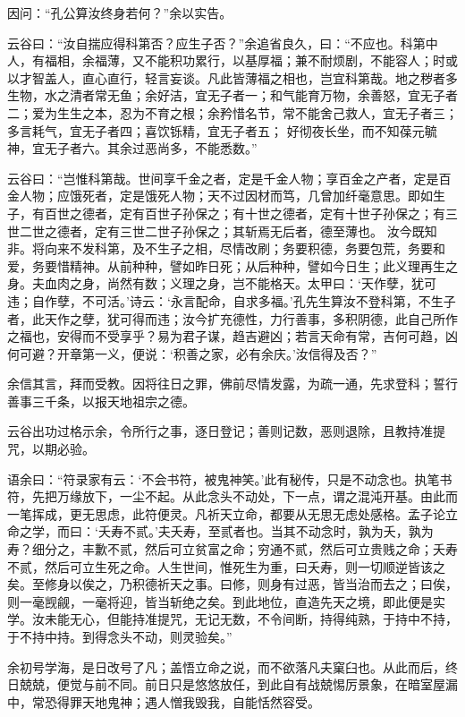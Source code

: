 \documentclass[letterpaper,10pt,english]{sphinxmanual}
\begin{document}
因问：“孔公算汝终身若何？”余以实告。

云谷曰：“汝自揣应得科第否？应生子否？”余追省良久，曰：“不应也。科第中人，有福相，余福薄，又不能积功累行，以基厚福；兼不耐烦剧，不能容人；时或以才智盖人，直心直行，轻言妄谈。凡此皆薄福之相也，岂宜科第哉。地之秽者多生物，水之清者常无鱼；余好洁，宜无子者一；和气能育万物，余善怒，宜无子者二；爱为生生之本，忍为不育之根；余矜惜名节，常不能舍己救人，宜无子者三； 多言耗气，宜无子者四；喜饮铄精，宜无子者五； 好彻夜长坐，而不知葆元毓神，宜无子者六。其余过恶尚多，不能悉数。”

云谷曰：“岂惟科第哉。世间享千金之者，定是千金人物；享百金之产者，定是百金人物；应饿死者，定是饿死人物；天不过因材而笃，几曾加纤毫意思。即如生子，有百世之德者，定有百世子孙保之；有十世之德者，定有十世子孙保之；有三世二世之德者，定有三世二世子孙保之；其斩焉无后者，德至薄也。 汝今既知非。将向来不发科第，及不生子之相，尽情改刷；务要积德，务要包荒，务要和爱，务要惜精神。从前种种，譬如昨日死；从后种种，譬如今日生；此义理再生之身。夫血肉之身，尚然有数；义理之身，岂不能格天。太甲曰：‘天作孽，犹可违；自作孽，不可活。’诗云：‘永言配命，自求多福。’孔先生算汝不登科第，不生子者，此天作之孽，犹可得而违；汝今扩充德性，力行善事，多积阴德，此自己所作之福也，安得而不受享乎？易为君子谋，趋吉避凶；若言天命有常，吉何可趋，凶何可避？开章第一义，便说：‘积善之家，必有余庆。’汝信得及否？”

余信其言，拜而受教。因将往日之罪，佛前尽情发露，为疏一通，先求登科；誓行善事三千条，以报天地祖宗之德。

云谷出功过格示余，令所行之事，逐日登记；善则记数，恶则退除，且教持准提咒，以期必验。

语余曰：“符录家有云：‘不会书符，被鬼神笑。’此有秘传，只是不动念也。执笔书符，先把万缘放下，一尘不起。从此念头不动处，下一点，谓之混沌开基。由此而一笔挥成，更无思虑，此符便灵。凡祈天立命，都要从无思无虑处感格。孟子论立命之学，而曰：‘夭寿不贰。’夫夭寿，至贰者也。当其不动念时，孰为夭，孰为寿？细分之，丰歉不贰，然后可立贫富之命；穷通不贰，然后可立贵贱之命；夭寿不贰，然后可立生死之命。人生世间，惟死生为重，曰夭寿，则一切顺逆皆该之矣。至修身以俟之，乃积德祈天之事。曰修，则身有过恶，皆当治而去之；曰俟，则一毫觊觎，一毫将迎，皆当斩绝之矣。到此地位，直造先天之境，即此便是实学。汝未能无心，但能持准提咒，无记无数，不令间断，持得纯熟，于持中不持，于不持中持。到得念头不动，则灵验矣。”

余初号学海，是日改号了凡；盖悟立命之说，而不欲落凡夫窠臼也。从此而后，终日兢兢，便觉与前不同。前日只是悠悠放任，到此自有战兢惕厉景象，在暗室屋漏中，常恐得罪天地鬼神；遇人憎我毁我，自能恬然容受。
\end{document}
